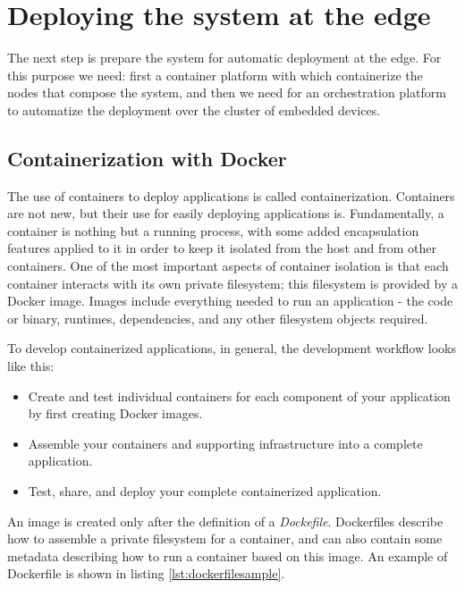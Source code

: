 \section{Deploying the system at the edge}
The next step is prepare the system for automatic deployment at the edge. For this purpose we need: first a container platform with which containerize the nodes that compose the system, and then we need for an orchestration platform to automatize the deployment over the cluster of embedded devices.

\subsection{Containerization with Docker}
The use of containers to deploy applications is called containerization. Containers are not new, but their use for easily deploying applications is.
Fundamentally, a container is nothing but a running process, with some added encapsulation features applied to it in order to keep it isolated from the host and from other containers. One of the most important aspects of container isolation is that each container interacts with its own private filesystem; this filesystem is provided by a Docker image. Images include everything needed to run an application - the code or binary, runtimes, dependencies, and any other filesystem objects required.

To develop containerized applications, in general, the development workflow looks like this:
\begin{itemize}
	\item Create and test individual containers for each component of your application by first creating Docker images.
	\item Assemble your containers and supporting infrastructure into a complete application.
	\item Test, share, and deploy your complete containerized application.
\end{itemize}

An image is created only after the definition of a \textit{Dockefile}. Dockerfiles describe how to assemble a private filesystem for a container, and can also contain some metadata describing how to run a container based on this image. An example of Dockerfile is shown in listing \ref{lst:dockerfilesample}.

